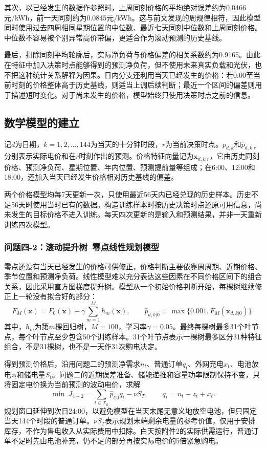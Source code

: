 \documentclass[11pt,a4paper]{article}
\begin{document}
其次，以已经发生的数据作参照时，上周同刻价格的平均绝对误差约为0.0466元/kWh，前一天同刻约为0.0845元/kWh。这与前文发现的周规律相符，因此模型同时使用过去四周相同星期位置的中位数、最近七天同刻中位数和上周同刻价格。中位数不容易被个别异常高价带偏，更适合作为滚动预测的历史基线。

最后，扣除同刻平均轮廓后，实际净负荷与价格偏差的相关系数约为0.9165。由此在特征中加入决策时点能够得到的预测净负荷，但不使用未来真实负载和光伏，也不把这种统计关系解释为因果。日内分支还利用当天已经发生的价格：若0:00至当前时刻的价格整体高于历史基线，则适当上调后续判断；最近一个区间的偏差则用于描述短时变化。对于尚未发生的价格，模型始终只使用决策时点之前的信息。

\subsection{数学模型的建立}

记$d$为日期，$k=1,2,\ldots,144$为当天的十分钟时段，$r$为当前决策时点。$p_{d,k}$和$\widehat p_{d,k|r}$分别表示实际电价和在$r$时刻作出的预测。价格特征向量记为$\boldsymbol x_{d,k|r}$，它由历史同刻价格、预测净负荷、星期位置、年内位置、预测提前量等组成；在6:00、12:00和18:00，还加入当天已经发生价格相对历史基线的偏差。

两个价格模型均每7天更新一次，只使用最近56天内已经兑现的历史样本。历史不足56天时使用当时已有的数据。构造训练样本时按历史决策时点还原可用信息，尚未发生的目标价格不进入训练。每天四次更新的是输入和预测结果，并非一天重新训练四次模型。

\subsubsection{问题四-2：滚动提升树--零点线性规划模型}

零点还没有当天已经发生的价格可供修正，价格判断主要依靠周周期、近期价格、季节位置和预测净负荷。线性模型难以充分表达这些因素在不同价格区间下的组合关系，因此采用直方图梯度提升树。模型从一个初始价格判断开始，每棵树继续修正上一轮没有拟合好的部分：
\begin{equation}
 F_M(\boldsymbol x)=F_0(\boldsymbol x)+\gamma\sum_{m=1}^{M}h_m(\boldsymbol x),
 \qquad \widehat p_{d,k|0}=\max\{0.001,F_M(\boldsymbol x_{d,k|0})\}.
 \label{eq:q42tree}
\end{equation}
其中，$h_m$为第$m$棵回归树，$M=100$，学习率$\gamma=0.05$。最终每棵树最多31个叶节点，每个叶节点至少包含50个训练样本。31个叶节点表示一棵树最多区分31种特征组合，不是31棵树，也不是一天作31次购电决定。

得到预测价格后，沿用问题二的预测净需求$n_t$、普通订单$q_t$、外网充电$x_t$、电池放电$z_t$和储电量$S_t$。问题二的近期误差准备、储能递推和容量功率限制保持不变，只将固定电价换为当前预测的波动电价，求解
\begin{equation}
 \min\ J_{4-2}=\sum_{t\in\mathcal T_0}\widehat p_{t|0}q_t-\nu S_T,
 \qquad q_t=n_t-z_t+x_t.
 \label{eq:q42lp}
\end{equation}
规划窗口延伸到次日24:00，以避免模型在当天末尾无意义地放空电池，但只固定当天144个时段的普通订单。$\nu S_T$表示规划末端剩余电量的参考价值，仅用于安排库存，不作为售电收入从实际费用中扣除。白天按附件2的实际供需运行，普通订单不足时先由电池补充，仍不足的部分再按实际电价的5倍紧急购电。
\end{document}
